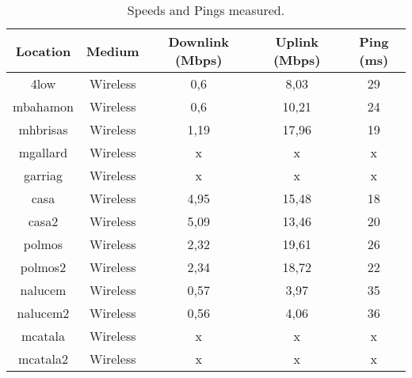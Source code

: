 \begin{table}[h]
\caption[Speed Test: Speeds and Ping measured]{Speeds and Pings measured. }
\begin{center}
\begin{tabular}{|c||c|c|c|c|}
\hline
Location  & Medium  & Downlink (Mbps) & Uplink (Mbps) & Ping (ms)\\ \hline\hline
 4low     & Wireless & 0,6            & 8,03          & 29 \\ \hline       %
 mbahamon & Wireless & 0,6            & 10,21         & 24 \\ \hline       %
 mhbrisas & Wireless & 1,19           & 17,96         & 19 \\ \hline       %
 mgallard & Wireless & x              & x             & x \\ \hline        %
 garriag  & Wireless & x              & x             & x \\ \hline        %
 casa     & Wireless & 4,95           & 15,48         & 18 \\ \hline       %
 casa2    & Wireless & 5,09           & 13,46         & 20 \\ \hline       %
 polmos   & Wireless & 2,32           & 19,61         & 26 \\ \hline       %
 polmos2  & Wireless & 2,34           & 18,72         & 22 \\ \hline       %
 nalucem  & Wireless & 0,57           & 3,97          & 35 \\ \hline       %
 nalucem2 & Wireless & 0,56           & 4,06          & 36 \\ \hline       %
 mcatala  & Wireless & x              & x 			  & x \\ \hline        %
 mcatala2 & Wireless & x              & x 			  & x \\ \hline        %
\end{tabular}
\end{center}
\label{table:speeds}
\end{table}

